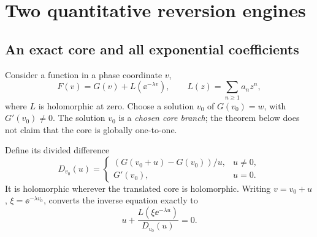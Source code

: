 \section{Two quantitative reversion engines}\label{sec:engines}

\subsection{An exact core and all exponential coefficients}

Consider a function in a phase coordinate \(v\),
\begin{equation}\label{eq:core-form}
 F(v)=G(v)+L(\ee^{-\lambda v}),\qquad
 L(z)=\sum_{n\ge1}a_nz^n,
\end{equation}
where \(L\) is holomorphic at zero.
Choose a solution \(v_0\) of \(G(v_0)=w\), with \(G'(v_0)\ne0\).
The solution \(v_0\) is a \emph{chosen core branch}; the theorem below
does not claim that the core is globally one-to-one.

Define its divided difference
\[
 D_{v_0}(u)=
 \begin{cases}
 (G(v_0+u)-G(v_0))/u,&u\ne0,\\
 G'(v_0),&u=0.
 \end{cases}
\]
It is holomorphic wherever the translated core is holomorphic.
Writing \(v=v_0+u\), \(\xi=\ee^{-\lambda v_0}\), converts the
inverse equation exactly to
\begin{equation}\label{eq:core-implicit}
 u+\frac{L(\xi\ee^{-\lambda u})}{D_{v_0}(u)}=0.
\end{equation}


